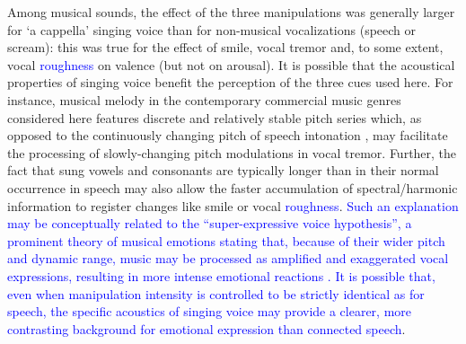 \documentclass[openacc]{rsprocb_new}%
\begin{document}
Among musical sounds, the effect of the three manipulations was generally larger for `a cappella' singing voice than for non-musical vocalizations (speech or scream): this was true for the effect of smile, vocal tremor and, to some extent, vocal \textcolor{blue}{roughness} on valence (but not on arousal). It is possible that the acoustical properties of singing voice \cite{SCH15} benefit the perception of the three cues used here. For instance, musical melody in the contemporary commercial music genres considered here features discrete and relatively stable pitch series which, as opposed to the continuously changing pitch of speech intonation \cite{ZAT12}, may facilitate the processing of slowly-changing pitch modulations in vocal tremor. Further, the fact that sung vowels and consonants are typically longer than in their normal occurrence in speech \cite{DUA13} may also allow the faster accumulation of spectral/harmonic information to register changes like smile or vocal \textcolor{blue}{roughness}. \textcolor{blue}{Such an explanation may be conceptually related to the ``super-expressive voice hypothesis'', a prominent theory of musical emotions stating that, because of their wider pitch and dynamic range, music may be processed as amplified and exaggerated vocal expressions, resulting in more intense emotional reactions \cite{JUSL03,JUS08}. It is possible that, even when manipulation intensity is controlled to be strictly identical as for speech, the specific acoustics of singing voice may provide a clearer, more contrasting background for emotional expression than connected speech}. 
\end{document}
